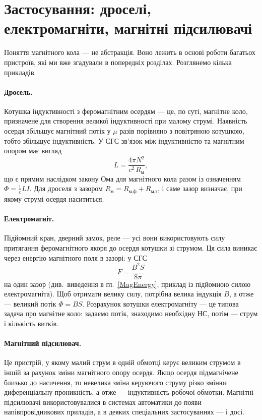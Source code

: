 \documentclass[]{ConspectBook}
\begin{document}
\section{Застосування: дроселі, електромагніти, магнітні підсилювачі}

Поняття магнітного кола --- не абстракція. Воно лежить в основі роботи багатьох пристроїв, які ми вже згадували в попередніх розділах. Розглянемо кілька прикладів.

\paragraph*{Дросель.} Котушка індуктивності з феромагнітним осердям --- це, по суті, магнітне коло, призначене для створення великої індуктивності при малому струмі. Наявність осердя збільшує магнітний потік у $\mu$ разів порівняно з повітряною котушкою, тобто збільшує індуктивність. У СГС зв'язок між індуктивністю та магнітним опором має вигляд
\begin{equation}\label{eq:inductance_reluctance}
	L = \frac{4\pi N^2}{c^2\,R_{\text{м}}},
\end{equation}
що є прямим наслідком закону Ома для магнітного кола разом із означенням $\Phi = \frac{1}{c}LI$. Для дроселя з зазором $R_{\text{м}} = R_{\text{м,ф}} + R_{\text{м,з}}$, і саме зазор визначає, при якому струмі осердя насититься.

\paragraph*{Електромагніт.} Підйомний кран, дверний замок, реле --- усі вони використовують силу притягання феромагнітного якоря до осердя котушки зі струмом. Ця сила виникає через енергію магнітного поля в зазорі: у СГС
\begin{equation}\label{eq:electromagnet_force}
	F = \frac{B^2 S}{8\pi}
\end{equation}
на один зазор (див.~виведення в гл.~\ref{MagEnergy}, приклад із підйомною силою електромагніта). Щоб отримати велику силу, потрібна велика індукція $B$, а отже --- великий потік $\Phi = BS$. Розрахунок котушки електромагніту --- це типова задача про магнітне коло: задаємо потік, знаходимо необхідну НС, потім --- струм і кількість витків.

\paragraph*{Магнітний підсилювач.} Це пристрій, у якому малий струм в одній обмотці керує великим струмом в іншій за рахунок зміни магнітного опору осердя. Якщо осердя підмагнічене близько до насичення, то невелика зміна керуючого струму різко змінює диференціальну проникність, а отже --- індуктивність робочої обмотки. Магнітні підсилювачі використовувалися в системах автоматики до появи напівпровідникових приладів, а в деяких спеціальних застосуваннях --- і досі.
\end{document}
